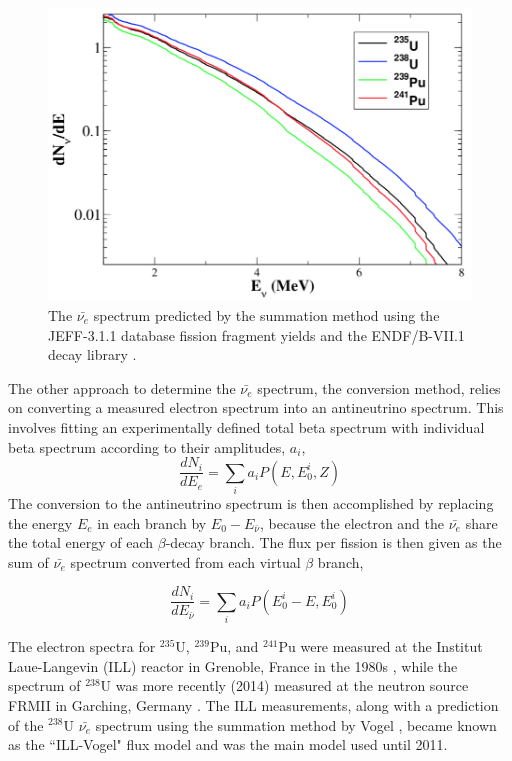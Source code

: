 \begin{figure}[t]
	\centering
	\includegraphics[width=0.65\linewidth]{tex/3-reactorneutrinos-images/Spectrum}
	\caption{The $\bar{\nu_e}$ spectrum predicted by the summation method using the JEFF-3.1.1 database fission fragment yields and the ENDF/B-VII.1 decay library \cite{HayesVogel}.}
	\label{fig:spectrum}
\end{figure}

The other approach to determine the $\bar{\nu_{e}}$ spectrum, the conversion method, relies on converting a measured electron spectrum into an antineutrino spectrum. 
This involves fitting an experimentally defined total beta spectrum with individual beta spectrum  according to their amplitudes, $a_i$, 
\begin{equation}
	\frac{dN_i}{dE_e} = \sum_{i}a_iP(E,E^i_0,Z)
\end{equation}
The conversion to the antineutrino spectrum is then accomplished by replacing the energy $E_e$ in each branch by $E_0 - E_{\bar{\nu}}$, because the electron and the $\bar{\nu_e}$ share the total energy of each $\beta$-decay branch.
The flux per fission is then given as the sum of $\bar{\nu_e}$ spectrum converted from each virtual $\beta$ branch,

\begin{equation}
	\frac{dN_i}{dE_{\bar{\nu}}} = \sum_{i}a_iP(E^i_0-E,E^i_0)
\end{equation}


The electron spectra for $^{235}$U, $^{239}$Pu, and $^{241}$Pu were measured at the Institut
Laue-Langevin (ILL) reactor in Grenoble, France in the 1980s \cite{VonFeilitzsch:1982jw,Schreckenbach:1985ep,Hahn:1989zr}, while the spectrum of $^{238}$U was more recently (2014) measured at the neutron source FRMII in Garching, Germany \cite{Haag:2013raa}.
The ILL measurements, along with a prediction of the $^{238}$U $\bar{\nu_{e}}$ spectrum using the summation method by Vogel \cite{PhysRevC.24.1543}, became known as the ``ILL-Vogel" flux model and was the main model used until 2011.

